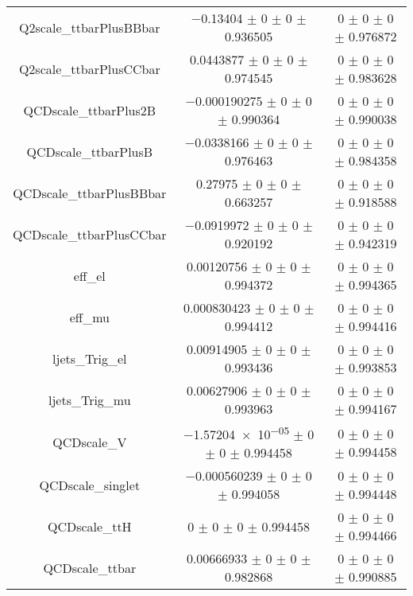 \begin{table}
\begin{tabular}{ccc}
Q2scale\_ttbarPlusBBbar & \num{-0.13404} $\pm$ \num{0} $\pm$ \num{0} $\pm$ \num{0.936505} & \num{0} $\pm$ \num{0} $\pm$ \num{0} $\pm$ \num{0.976872}\\
Q2scale\_ttbarPlusCCbar & \num{0.0443877} $\pm$ \num{0} $\pm$ \num{0} $\pm$ \num{0.974545} & \num{0} $\pm$ \num{0} $\pm$ \num{0} $\pm$ \num{0.983628}\\
QCDscale\_ttbarPlus2B & \num{-0.000190275} $\pm$ \num{0} $\pm$ \num{0} $\pm$ \num{0.990364} & \num{0} $\pm$ \num{0} $\pm$ \num{0} $\pm$ \num{0.990038}\\
QCDscale\_ttbarPlusB & \num{-0.0338166} $\pm$ \num{0} $\pm$ \num{0} $\pm$ \num{0.976463} & \num{0} $\pm$ \num{0} $\pm$ \num{0} $\pm$ \num{0.984358}\\
QCDscale\_ttbarPlusBBbar & \num{0.27975} $\pm$ \num{0} $\pm$ \num{0} $\pm$ \num{0.663257} & \num{0} $\pm$ \num{0} $\pm$ \num{0} $\pm$ \num{0.918588}\\
QCDscale\_ttbarPlusCCbar & \num{-0.0919972} $\pm$ \num{0} $\pm$ \num{0} $\pm$ \num{0.920192} & \num{0} $\pm$ \num{0} $\pm$ \num{0} $\pm$ \num{0.942319}\\
eff\_el & \num{0.00120756} $\pm$ \num{0} $\pm$ \num{0} $\pm$ \num{0.994372} & \num{0} $\pm$ \num{0} $\pm$ \num{0} $\pm$ \num{0.994365}\\
eff\_mu & \num{0.000830423} $\pm$ \num{0} $\pm$ \num{0} $\pm$ \num{0.994412} & \num{0} $\pm$ \num{0} $\pm$ \num{0} $\pm$ \num{0.994416}\\
ljets\_Trig\_el & \num{0.00914905} $\pm$ \num{0} $\pm$ \num{0} $\pm$ \num{0.993436} & \num{0} $\pm$ \num{0} $\pm$ \num{0} $\pm$ \num{0.993853}\\
ljets\_Trig\_mu & \num{0.00627906} $\pm$ \num{0} $\pm$ \num{0} $\pm$ \num{0.993963} & \num{0} $\pm$ \num{0} $\pm$ \num{0} $\pm$ \num{0.994167}\\
QCDscale\_V & \num{-1.57204e-05} $\pm$ \num{0} $\pm$ \num{0} $\pm$ \num{0.994458} & \num{0} $\pm$ \num{0} $\pm$ \num{0} $\pm$ \num{0.994458}\\
QCDscale\_singlet & \num{-0.000560239} $\pm$ \num{0} $\pm$ \num{0} $\pm$ \num{0.994058} & \num{0} $\pm$ \num{0} $\pm$ \num{0} $\pm$ \num{0.994448}\\
QCDscale\_ttH & \num{0} $\pm$ \num{0} $\pm$ \num{0} $\pm$ \num{0.994458} & \num{0} $\pm$ \num{0} $\pm$ \num{0} $\pm$ \num{0.994466}\\
QCDscale\_ttbar & \num{0.00666933} $\pm$ \num{0} $\pm$ \num{0} $\pm$ \num{0.982868} & \num{0} $\pm$ \num{0} $\pm$ \num{0} $\pm$ \num{0.990885}\\

\end{tabular}
\end{table}
